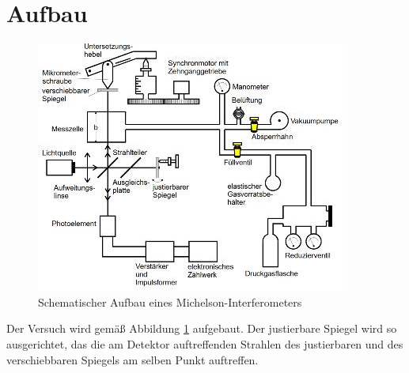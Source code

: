 \section{Aufbau}
\label{sec:Aufbau}

\begin{figure}
\centering
\includegraphics[scale=0.5]{content/images/aufbau.jpg}
\caption{Schematischer Aufbau eines Michelson-Interferometers\cite{V401}}
\label{fig:Aufbau}
\end{figure}

Der Versuch wird gemäß Abbildung \ref{fig:Aufbau} aufgebaut. Der justierbare Spiegel wird so ausgerichtet, das die am Detektor auftreffenden Strahlen des justierbaren und des verschiebbaren Spiegels
am selben Punkt auftreffen.